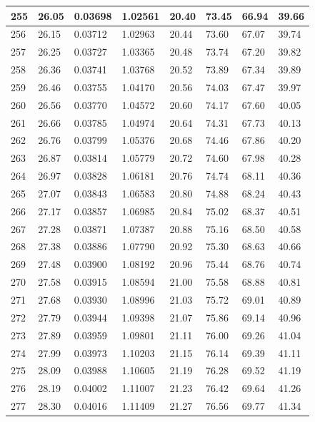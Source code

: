 \documentclass[12pt,a4paper,twoside]{article}
\begin{document}
\begin{center}
\begin{longtable}{l l l l | l l l l}
255 & 26.05 & 0.03698 & 1.02561 & 20.40 & 73.45 & 66.94 & 39.66 \\ \hline
256 & 26.15 & 0.03712 & 1.02963 & 20.44 & 73.60 & 67.07 & 39.74 \\ \hline
257 & 26.25 & 0.03727 & 1.03365 & 20.48 & 73.74 & 67.20 & 39.82 \\ \hline
258 & 26.36 & 0.03741 & 1.03768 & 20.52 & 73.89 & 67.34 & 39.89 \\ \hline
259 & 26.46 & 0.03755 & 1.04170 & 20.56 & 74.03 & 67.47 & 39.97 \\ \hline
260 & 26.56 & 0.03770 & 1.04572 & 20.60 & 74.17 & 67.60 & 40.05 \\ \hline
261 & 26.66 & 0.03785 & 1.04974 & 20.64 & 74.31 & 67.73 & 40.13 \\ \hline
262 & 26.76 & 0.03799 & 1.05376 & 20.68 & 74.46 & 67.86 & 40.20 \\ \hline
263 & 26.87 & 0.03814 & 1.05779 & 20.72 & 74.60 & 67.98 & 40.28 \\ \hline
264 & 26.97 & 0.03828 & 1.06181 & 20.76 & 74.74 & 68.11 & 40.36 \\ \hline
265 & 27.07 & 0.03843 & 1.06583 & 20.80 & 74.88 & 68.24 & 40.43 \\ \hline
266 & 27.17 & 0.03857 & 1.06985 & 20.84 & 75.02 & 68.37 & 40.51 \\ \hline
267 & 27.28 & 0.03871 & 1.07387 & 20.88 & 75.16 & 68.50 & 40.58 \\ \hline
268 & 27.38 & 0.03886 & 1.07790 & 20.92 & 75.30 & 68.63 & 40.66 \\ \hline
269 & 27.48 & 0.03900 & 1.08192 & 20.96 & 75.44 & 68.76 & 40.74 \\ \hline
270 & 27.58 & 0.03915 & 1.08594 & 21.00 & 75.58 & 68.88 & 40.81 \\ \hline
271 & 27.68 & 0.03930 & 1.08996 & 21.03 & 75.72 & 69.01 & 40.89 \\ \hline
272 & 27.79 & 0.03944 & 1.09398 & 21.07 & 75.86 & 69.14 & 40.96 \\ \hline
273 & 27.89 & 0.03959 & 1.09801 & 21.11 & 76.00 & 69.26 & 41.04 \\ \hline
274 & 27.99 & 0.03973 & 1.10203 & 21.15 & 76.14 & 69.39 & 41.11 \\ \hline
275 & 28.09 & 0.03988 & 1.10605 & 21.19 & 76.28 & 69.52 & 41.19 \\ \hline
276 & 28.19 & 0.04002 & 1.11007 & 21.23 & 76.42 & 69.64 & 41.26 \\ \hline
277 & 28.30 & 0.04016 & 1.11409 & 21.27 & 76.56 & 69.77 & 41.34 \\ \hline

\end{longtable}
\end{center}
\end{document}
